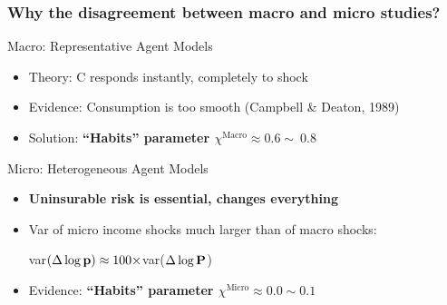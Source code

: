\documentclass[10pt,english,t,10pt]{beamer}
\newcommand{\jemph}[1]{{\color{StataDarkBlue}#1}}
\newcommand{\jbemph}[1]{\textbf{\color{SlideNavy}#1}}
\providecommand{\jemph}[1]{{\color{jirkasblue}#1}}
\begin{document}
\begin{frame}
\frametitle{Why the disagreement between macro and micro studies?}

\begin{block}{Macro: Representative Agent Models}
	\begin{itemize}
		\item  Theory: C responds instantly, completely to shock
		\item Evidence: Consumption is too smooth {\scriptsize (Campbell {\&} Deaton, 1989)}
		\item Solution: \jbemph{``Habits'' parameter $\chi^{\text{Macro}}\approx 0.6\sim~0.8$}\\
	\end{itemize}
\end{block}

\pause 

\begin{block}{Micro: Heterogeneous Agent Models}
	\begin{itemize}
		\item  \jbemph{Uninsurable risk is essential, changes everything}
		\item Var of micro income shocks much larger than of macro shocks:\\
		\centerline{    \jemph{var$(\Delta \log \mathbf{p}) \approx  100\times$var($\Delta \log \mathbf{P}$)}}
		\item Evidence: \jbemph{``Habits'' parameter $\chi^{\text{Micro}}\approx 0.0\sim 0.1$}
	\end{itemize}
\end{block}

\end{frame}





\end{document}
